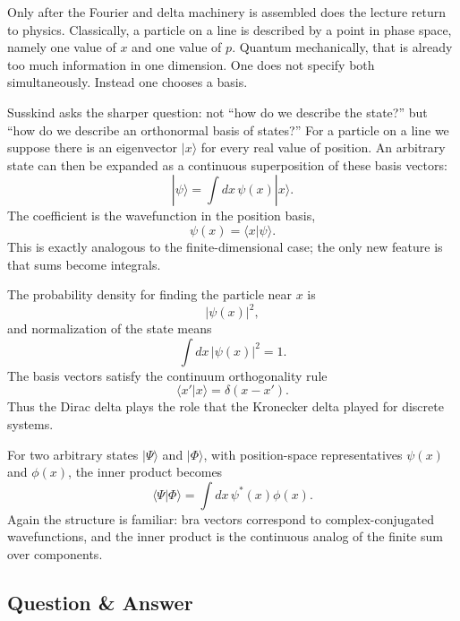 Only after the Fourier and delta machinery is assembled does the lecture return to physics. Classically, a particle on a line is described by a point in phase space, namely one value of $x$ and one value of $p$. Quantum mechanically, that is already too much information in one dimension. One does not specify both simultaneously. Instead one chooses a basis.

Susskind asks the sharper question: not ``how do we describe the state?'' but ``how do we describe an orthonormal basis of states?'' For a particle on a line we suppose there is an eigenvector $|x\rangle$ for every real value of position. An arbitrary state can then be expanded as a continuous superposition of these basis vectors:
\begin{equation}
|\psi\rangle=\int dx\,\psi(x)|x\rangle.
\end{equation}
The coefficient is the wavefunction in the position basis,
\begin{equation}
\psi(x)=\langle x|\psi\rangle.
\end{equation}
This is exactly analogous to the finite-dimensional case; the only new feature is that sums become integrals.

The probability density for finding the particle near $x$ is
\begin{equation}
|\psi(x)|^2,
\end{equation}
and normalization of the state means
\begin{equation}
\int dx\,|\psi(x)|^2=1.
\end{equation}
The basis vectors satisfy the continuum orthogonality rule
\begin{equation}
\langle x'|x\rangle=\delta(x-x').
\end{equation}
Thus the Dirac delta plays the role that the Kronecker delta played for discrete systems.

For two arbitrary states $|\Psi\rangle$ and $|\Phi\rangle$, with position-space representatives $\psi(x)$ and $\phi(x)$, the inner product becomes
\begin{equation}
\langle \Psi|\Phi\rangle=\int dx\,\psi^*(x)\phi(x).
\end{equation}
Again the structure is familiar: bra vectors correspond to complex-conjugated wavefunctions, and the inner product is the continuous analog of the finite sum over components.

\subsection{Question \& Answer}


